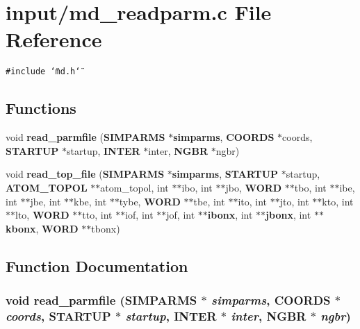 \section{input/md\_\-readparm.c File Reference}
\label{input_2md__readparm_8c}
{\tt \#include \char`\"{}md.h\char`\"{}}\par
\subsection*{Functions}
\begin{CompactItemize}
\item 
void {\bf read\_\-parmfile} ({\bf SIMPARMS} $\ast${\bf simparms}, {\bf COORDS} $\ast$coords, {\bf STARTUP} $\ast$startup, {\bf INTER} $\ast$inter, {\bf NGBR} $\ast$ngbr)
\item 
void {\bf read\_\-top\_\-file} ({\bf SIMPARMS} $\ast${\bf simparms}, {\bf STARTUP} $\ast$startup, {\bf ATOM\_\-TOPOL} $\ast$$\ast$atom\_\-topol, int $\ast$$\ast$ibo, int $\ast$$\ast$jbo, {\bf WORD} $\ast$$\ast$tbo, int $\ast$$\ast$ibe, int $\ast$$\ast$jbe, int $\ast$$\ast$kbe, int $\ast$$\ast$tybe, {\bf WORD} $\ast$$\ast$tbe, int $\ast$$\ast$ito, int $\ast$$\ast$jto, int $\ast$$\ast$kto, int $\ast$$\ast$lto, {\bf WORD} $\ast$$\ast$tto, int $\ast$$\ast$iof, int $\ast$$\ast$jof, int $\ast$$\ast${\bf ibonx}, int $\ast$$\ast${\bf jbonx}, int $\ast$$\ast${\bf kbonx}, {\bf WORD} $\ast$$\ast$tbonx)
\end{CompactItemize}


\subsection{Function Documentation}
\subsubsection{\setlength{\rightskip}{0pt plus 5cm}void read\_\-parmfile ({\bf SIMPARMS} $\ast$ {\em simparms}, {\bf COORDS} $\ast$ {\em coords}, {\bf STARTUP} $\ast$ {\em startup}, {\bf INTER} $\ast$ {\em inter}, {\bf NGBR} $\ast$ {\em ngbr})}\label{input_2md__readparm_8c_098e8de7f740d4e3126b1b9b1df1b446}


